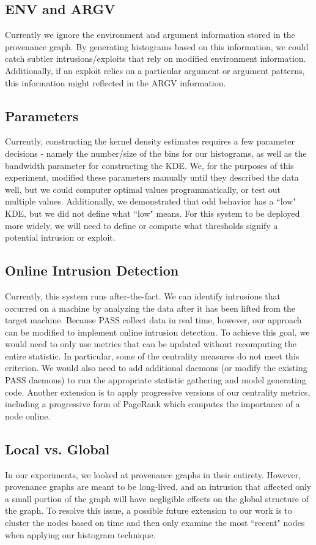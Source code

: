 \documentclass[10pt,twocolumn]{article}
\begin{document}
\subsection{ENV and ARGV}
Currently we ignore the environment and argument information stored in the provenance graph. By generating histograms based on this information, we could catch subtler intrusions/exploits that rely on modified environment information. Additionally, if an exploit relies on a particular argument or argument patterns, this information might reflected in the ARGV information.
\subsection{Parameters}
Currently, constructing the kernel density estimates requires a few parameter decisions - namely the number/size of the bins for our histograms, as well as the bandwidth parameter for constructing the KDE. We, for the purposes of this experiment, modified these parameters manually until they described the data well, but we could computer optimal values programmatically, or test out multiple values. Additionally, we demonstrated that odd behavior has a ``low" KDE, but we did not define what ``low" means. For this system to be deployed more widely, we will need to define or compute what thresholds signify a potential intrusion or exploit.
\subsection{Online Intrusion Detection}
Currently, this system runs after-the-fact. We can identify intrusions that occurred on a machine by analyzing the data after it has been lifted from the target machine. Because PASS collect data in real time, however, our approach can be modified to implement online intrusion detection. To achieve this goal, we would need to only use metrics that can be updated without recomputing the entire statistic. In particular, some of the centrality measures do not meet this criterion. We would also need to add additional daemons (or modify the existing PASS daemons) to run the appropriate statistic gathering and model generating code. Another extension is to apply progressive versions of our centrality metrics, including a progressive form of PageRank which computes the importance of a node online.
\subsection{Local vs. Global}
In our experiments, we looked at provenance graphs in their entirety. However, provenance graphs are meant to be long-lived, and an intrusion that affected only a small portion of the graph will have negligible effects on the global structure of the graph. To resolve this issue, a possible future extension to our work is to cluster the nodes based on time \cite{clustering} and then only examine the most ``recent" nodes when applying our histogram technique.
\end{document}
